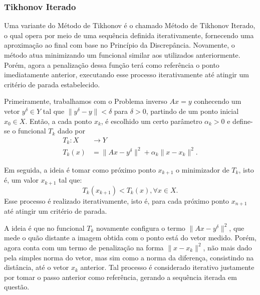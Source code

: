 


\subsubsection{Tikhonov Iterado}

Uma variante do Método de Tikhonov é o chamado Método de Tikhonov Iterado, o qual opera por meio de uma sequência definida iterativamente, fornecendo uma aproximação ao final com base no Princípio da Discrepância. Novamente, o método atua minimizando um funcional similar aos utilizados anteriormente. Porém, agora a penalização dessa função terá como referência o ponto imediatamente anterior, executando esse processo iterativamente até atingir um critério de parada estabelecido.

Primeiramente, trabalhamos com o Problema inverso $Ax=y$ conhecendo um vetor $y^\delta \in Y$ tal que $\| y^\delta  - y\|<\delta$ para $\delta>0$, partindo de um ponto inicial $x_0 \in X$. Então, a cada ponto $x_k$, é escolhido um certo parâmetro $\alpha_k>0$ e define-se o funcional $T_k$ dado por
\begin{align*}
    T_k : X &\to Y \\
    T_k(x) & =\| Ax - y^\delta \|^2 + \alpha_k \| x - x_k \|^2.
\end{align*}

Em seguida, a ideia é tomar como próximo ponto $x_{k+1}$ o minimizador de $T_k$, isto é, um valor $x_{k+1}$ tal que:
\begin{equation*}
    T_k(x_{k+1}) < T_k(x), \forall x \in X.
\end{equation*}
Esse processo é realizado iterativamente, isto é, para cada próximo ponto $x_{n+1}$ até atingir um critério de parada. 

A ideia é que no funcional $T_k$ novamente configura o termo $\| Ax - y^\delta \|^2$, que mede o quão distante a imagem obtida com o ponto está do vetor medido. Porém, agora conta com um termo de penalização na forma $\| x - x_k\|^2$, não mais dado pela simples norma do vetor, mas sim como a norma da diferença, consistindo na distância, até o vetor $x_k$ anterior. Tal processo é considerado iterativo justamente por tomar o passo anterior como referência, gerando a sequência iterada em questão.

